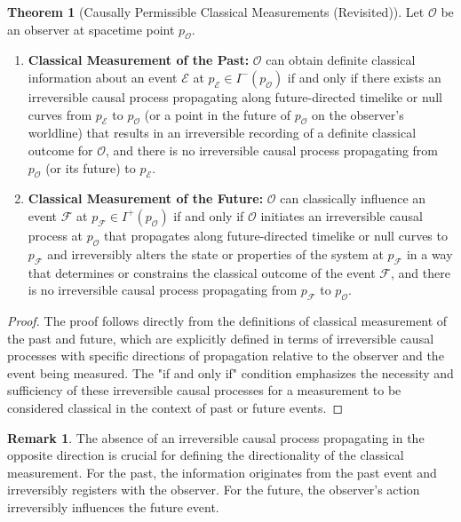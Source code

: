 \documentclass{article}
\theoremstyle{definition}
\newtheorem{theorem}[definition]{Theorem}
\newtheorem{remark}[definition]{Remark}
\begin{document}
	\begin{theorem}[Causally Permissible Classical Measurements (Revisited)]
		Let $\mathcal{O}$ be an observer at spacetime point $p_{\mathcal{O}}$.
		
		\begin{enumerate}
			\item \textbf{Classical Measurement of the Past:} $\mathcal{O}$ can obtain definite classical information about an event $\mathcal{E}$ at $p_{\mathcal{E}} \in I^-(p_{\mathcal{O}})$ if and only if there exists an irreversible causal process propagating along future-directed timelike or null curves from $p_{\mathcal{E}}$ to $p_{\mathcal{O}}$ (or a point in the future of $p_{\mathcal{O}}$ on the observer's worldline) that results in an irreversible recording of a definite classical outcome for $\mathcal{O}$, and there is no irreversible causal process propagating from $p_{\mathcal{O}}$ (or its future) to $p_{\mathcal{E}}$.
			
			\item \textbf{Classical Measurement of the Future:} $\mathcal{O}$ can classically influence an event $\mathcal{F}$ at $p_{\mathcal{F}} \in I^+(p_{\mathcal{O}})$ if and only if $\mathcal{O}$ initiates an irreversible causal process at $p_{\mathcal{O}}$ that propagates along future-directed timelike or null curves to $p_{\mathcal{F}}$ and irreversibly alters the state or properties of the system at $p_{\mathcal{F}}$ in a way that determines or constrains the classical outcome of the event $\mathcal{F}$, and there is no irreversible causal process propagating from $p_{\mathcal{F}}$ to $p_{\mathcal{O}}$.
		\end{enumerate}
		\begin{proof}
			The proof follows directly from the definitions of classical measurement of the past and future, which are explicitly defined in terms of irreversible causal processes with specific directions of propagation relative to the observer and the event being measured. The "if and only if" condition emphasizes the necessity and sufficiency of these irreversible causal processes for a measurement to be considered classical in the context of past or future events.
		\end{proof}
	\end{theorem}
	
	\begin{remark}
		The absence of an irreversible causal process propagating in the opposite direction is crucial for defining the directionality of the classical measurement. For the past, the information originates from the past event and irreversibly registers with the observer. For the future, the observer's action irreversibly influences the future event.
	\end{remark}
	
\end{document}
